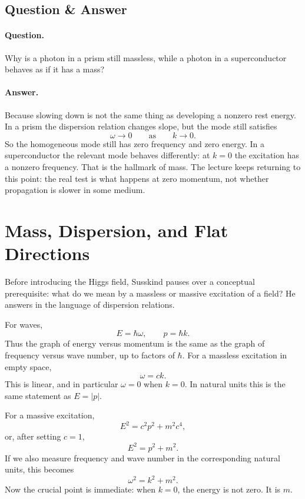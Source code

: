 \subsection{Question \& Answer}

\paragraph{Question.} Why is a photon in a prism still massless, while a photon in a superconductor behaves as if it has a mass?

\paragraph{Answer.} Because slowing down is not the same thing as developing a nonzero rest energy. In a prism the dispersion relation changes slope, but the mode still satisfies
\begin{equation}
\omega \to 0 \qquad \text{as} \qquad k \to 0.
\end{equation}
So the homogeneous mode still has zero frequency and zero energy. In a superconductor the relevant mode behaves differently: at \(k=0\) the excitation has a nonzero frequency. That is the hallmark of mass. The lecture keeps returning to this point: the real test is what happens at zero momentum, not whether propagation is slower in some medium.

\section{Mass, Dispersion, and Flat Directions}

Before introducing the Higgs field, Susskind pauses over a conceptual prerequisite: what do we mean by a massless or massive excitation of a field? He answers in the language of dispersion relations.

For waves,
\begin{equation}
E=\hbar\omega,
\qquad
p=\hbar k.
\end{equation}
Thus the graph of energy versus momentum is the same as the graph of frequency versus wave number, up to factors of \(\hbar\). For a massless excitation in empty space,
\begin{equation}
\omega = c k.
\end{equation}
This is linear, and in particular \(\omega=0\) when \(k=0\). In natural units this is the same statement as \(E=|p|\).

For a massive excitation,
\begin{equation}
E^2 = c^2 p^2 + m^2 c^4,
\end{equation}
or, after setting \(c=1\),
\begin{equation}
E^2 = p^2 + m^2.
\end{equation}
If we also measure frequency and wave number in the corresponding natural units, this becomes
\begin{equation}
\omega^2 = k^2 + m^2.
\end{equation}
Now the crucial point is immediate: when \(k=0\), the energy is not zero. It is \(m\).

